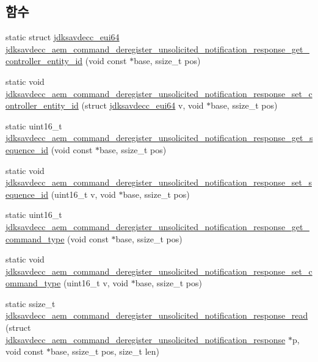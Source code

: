 \subsection*{함수}
\begin{DoxyCompactItemize}
\item 
static struct \hyperlink{structjdksavdecc__eui64}{jdksavdecc\+\_\+eui64} \hyperlink{group__command__deregister__unsolicited__notification__response_gabf7fbba39d3026fc3852da2334f01fbe}{jdksavdecc\+\_\+aem\+\_\+command\+\_\+deregister\+\_\+unsolicited\+\_\+notification\+\_\+response\+\_\+get\+\_\+controller\+\_\+entity\+\_\+id} (void const $\ast$base, ssize\+\_\+t pos)
\item 
static void \hyperlink{group__command__deregister__unsolicited__notification__response_ga3c81b5ffe5e9fe24e6ac46dbe3212b16}{jdksavdecc\+\_\+aem\+\_\+command\+\_\+deregister\+\_\+unsolicited\+\_\+notification\+\_\+response\+\_\+set\+\_\+controller\+\_\+entity\+\_\+id} (struct \hyperlink{structjdksavdecc__eui64}{jdksavdecc\+\_\+eui64} v, void $\ast$base, ssize\+\_\+t pos)
\item 
static uint16\+\_\+t \hyperlink{group__command__deregister__unsolicited__notification__response_gab41619543d0908e3c5084f4849b96ad8}{jdksavdecc\+\_\+aem\+\_\+command\+\_\+deregister\+\_\+unsolicited\+\_\+notification\+\_\+response\+\_\+get\+\_\+sequence\+\_\+id} (void const $\ast$base, ssize\+\_\+t pos)
\item 
static void \hyperlink{group__command__deregister__unsolicited__notification__response_ga447eb571ccf70eefd6f3ce890c3e6ee4}{jdksavdecc\+\_\+aem\+\_\+command\+\_\+deregister\+\_\+unsolicited\+\_\+notification\+\_\+response\+\_\+set\+\_\+sequence\+\_\+id} (uint16\+\_\+t v, void $\ast$base, ssize\+\_\+t pos)
\item 
static uint16\+\_\+t \hyperlink{group__command__deregister__unsolicited__notification__response_gaaac1c4e979e88c07007215eeacc6f738}{jdksavdecc\+\_\+aem\+\_\+command\+\_\+deregister\+\_\+unsolicited\+\_\+notification\+\_\+response\+\_\+get\+\_\+command\+\_\+type} (void const $\ast$base, ssize\+\_\+t pos)
\item 
static void \hyperlink{group__command__deregister__unsolicited__notification__response_ga929201d93b856889b490d1f1fe03213e}{jdksavdecc\+\_\+aem\+\_\+command\+\_\+deregister\+\_\+unsolicited\+\_\+notification\+\_\+response\+\_\+set\+\_\+command\+\_\+type} (uint16\+\_\+t v, void $\ast$base, ssize\+\_\+t pos)
\item 
static ssize\+\_\+t \hyperlink{group__command__deregister__unsolicited__notification__response_gae9710f948e0509eb46a644040bd1d703}{jdksavdecc\+\_\+aem\+\_\+command\+\_\+deregister\+\_\+unsolicited\+\_\+notification\+\_\+response\+\_\+read} (struct \hyperlink{structjdksavdecc__aem__command__deregister__unsolicited__notification__response}{jdksavdecc\+\_\+aem\+\_\+command\+\_\+deregister\+\_\+unsolicited\+\_\+notification\+\_\+response} $\ast$p, void const $\ast$base, ssize\+\_\+t pos, size\+\_\+t len)

\end{DoxyCompactItemize}
